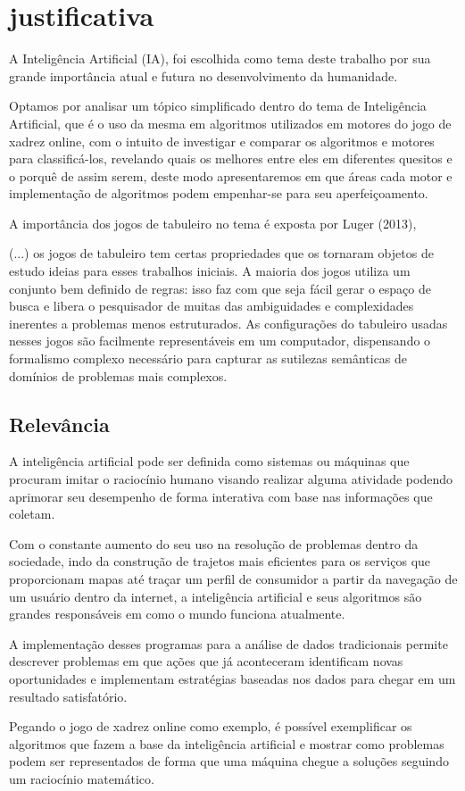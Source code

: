 \chapter{justificativa}

A Inteligência Artificial (IA), foi escolhida como tema deste trabalho por sua grande importância atual e futura no desenvolvimento da humanidade.

Optamos por analisar um tópico simplificado dentro do tema de Inteligência Artificial, que é o uso da mesma em algoritmos utilizados em motores do jogo de xadrez online, com o intuito de investigar e comparar os algoritmos e motores para classificá-los, revelando quais os melhores entre eles em diferentes quesitos e o porquê de assim serem, deste modo apresentaremos em que áreas cada motor e implementação de algoritmos podem empenhar-se para seu aperfeiçoamento.

A importância dos jogos de tabuleiro no tema é exposta por Luger (2013),
\begin{citacao}
    (...) os jogos de tabuleiro tem certas propriedades que os tornaram objetos de estudo ideias para esses trabalhos iniciais.
    A maioria dos jogos utiliza um conjunto bem definido de regras: isso faz com que seja fácil gerar o espaço de busca e
    libera o pesquisador de muitas das ambiguidades e complexidades inerentes a problemas menos estruturados.
    As configurações do tabuleiro usadas nesses jogos são facilmente representáveis em um computador,
    dispensando o formalismo complexo necessário para capturar as sutilezas semânticas de domínios de problemas mais
    complexos. \cite[p.17]{luger}
\end{citacao}

\section{Relevância}
A inteligência artificial pode ser definida como sistemas ou máquinas que procuram imitar o raciocínio humano visando realizar
alguma atividade podendo aprimorar seu desempenho de forma interativa com base nas informações que coletam.

Com o constante aumento do seu uso na resolução de problemas dentro da sociedade, indo da construção de trajetos mais
eficientes para os serviços que proporcionam mapas até traçar um perfil de consumidor a partir da navegação de um usuário
dentro da internet, a inteligência artificial e seus algoritmos são grandes responsáveis em como o mundo funciona atualmente.

A implementação desses programas para a análise de dados tradicionais permite descrever problemas em que ações que já
aconteceram identificam novas oportunidades e implementam estratégias baseadas nos dados para chegar em um resultado
satisfatório.

Pegando o jogo de xadrez online como exemplo,  é possível exemplificar os algoritmos que fazem a base da inteligência
artificial e mostrar como problemas podem ser representados de forma que uma máquina chegue a soluções seguindo um raciocínio
matemático.
